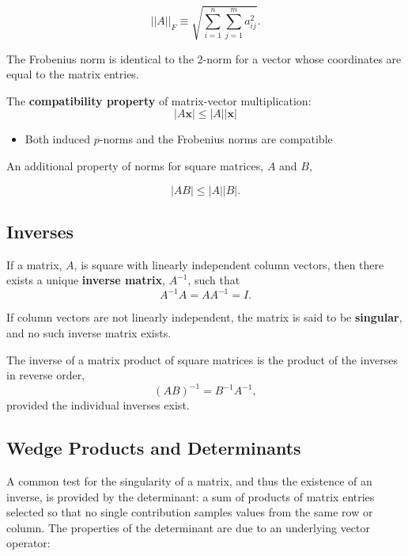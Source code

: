 \documentclass[12pt, twoside, draft]{article}
\begin{document}
\begin{equation}\label{eq:Frobenius_norm}
||A||_F \equiv \sqrt{\sum_{i=1}^n \sum_{j=1}^m a_{ij}^2} .
\end{equation}

The Frobenius norm is identical to the 2-norm for a vector whose coordinates are equal to the matrix entries.

The \textbf{compatibility property} of matrix-vector multiplication:
\begin{equation}\label{eq:compatibility_property}
|A \mathbf{x}| \leq |A||\mathbf{x}|
\end{equation}

\begin{itemize}
\item Both induced $p$-norms and the Frobenius norms are compatible
\end{itemize}

An additional property of norms for square matrices, $A$ and $B$,

\begin{equation}\label{eq:square_matrix_bound}
|AB| \leq |A| |B|.
\end{equation}




\subsection{Inverses}\label{sec:inverses}
If a matrix, $A$, is square with linearly independent column vectors, then there exists a unique \textbf{inverse matrix}, $A^{-1}$, such that 
\begin{equation}\label{eq:matrix_inverse}
A^{-1}A = AA^{-1} = I.
\end{equation}

If column vectors are not linearly independent, the matrix is said to be \textbf{singular}, and no such inverse matrix exists.

The inverse of a matrix product of square matrices is the product of the inverses in reverse order,
\begin{equation}\label{eq:matrix_inverse_product}
\left( AB \right)^{-1} = B^{-1}A^{-1},
\end{equation}
provided the individual inverses exist.


\subsection{Wedge Products and Determinants}\label{sec:determinants}
A common test for the singularity of a matrix, and thus the existence of an inverse, is provided by the determinant: a sum of products of matrix entries selected so that no single contribution samples values from the same row or column.  The properties of the determinant are due to an underlying vector operator:
\end{document}
